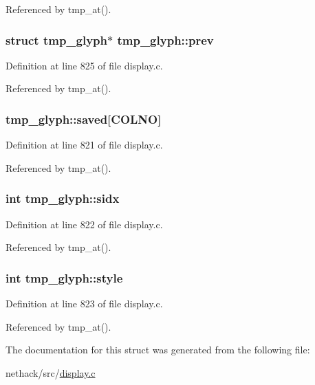 Referenced by tmp\+\_\+at().

\hypertarget{structtmp__glyph_a6766a3de9a941b007ad6908f10b1a296}{
\subsubsection[{prev}]{\setlength{\rightskip}{0pt plus 5cm}struct {\bf tmp\+\_\+glyph}$\ast$ tmp\+\_\+glyph\+::prev}}\label{structtmp__glyph_a6766a3de9a941b007ad6908f10b1a296}


Definition at line 825 of file display.\+c.



Referenced by tmp\+\_\+at().

\hypertarget{structtmp__glyph_a8db5e1fe6036daa9a46d8ce11cff5ef2}{
\subsubsection[{saved}]{ tmp\+\_\+glyph\+::saved\mbox{[}{\bf C\+O\+L\+N\+O}\mbox{]}}}\label{structtmp__glyph_a8db5e1fe6036daa9a46d8ce11cff5ef2}


Definition at line 821 of file display.\+c.



Referenced by tmp\+\_\+at().

\hypertarget{structtmp__glyph_acc72da60bdb24619fb87687d4575269a}{
\subsubsection[{sidx}]{\setlength{\rightskip}{0pt plus 5cm}int tmp\+\_\+glyph\+::sidx}}\label{structtmp__glyph_acc72da60bdb24619fb87687d4575269a}


Definition at line 822 of file display.\+c.



Referenced by tmp\+\_\+at().

\hypertarget{structtmp__glyph_ac6a6f9a0c1bf366f610a0195d9168d36}{
\subsubsection[{style}]{\setlength{\rightskip}{0pt plus 5cm}int tmp\+\_\+glyph\+::style}}\label{structtmp__glyph_ac6a6f9a0c1bf366f610a0195d9168d36}


Definition at line 823 of file display.\+c.



Referenced by tmp\+\_\+at().



The documentation for this struct was generated from the following file\+:\begin{DoxyCompactItemize}
\item 
nethack/src/\hyperlink{display_8c}{display.\+c}\end{DoxyCompactItemize}
